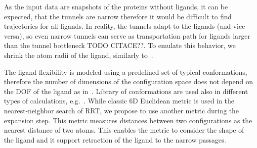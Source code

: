 \documentclass[usletter, 10pt, conference]{ieeeconf} %
\begin{document}
As the input data are snapshots of the proteins without ligands, it can be expected, that the tunnels are narrow therefore it would be difficult
to find trajectories for all ligands.
In reality, the tunnels adapt to the ligands (and vice versa), so even narrow tunnels can serve as transportation path for ligands larger than
the tunnel bottleneck TODO CITACE??.
To emulate this behavior, we shrink the atom radii of the ligand, similarly to~\cite{cortes2010simulating,guieysse2008structure}.

The ligand flexibility is modeled using a predefined set of typical conformations, therefore the number of dimensions of the configuration space does not depend on the DOF of the ligand as in~\cite{cortes2010simulating}.
Library of conformations are used also in different types of calculations, e.g.~\cite{kellogg}. 
While classic 6D Euclidean metric is used in the nearest-neighbor search of RRT, we propose to use another metric during the expansion step.
This metric measures distances between two configurations as the nearest distance of two atoms. 
This enables the metric to consider the shape of the ligand and it support retraction of the ligand to the narrow passages.


\end{document}
